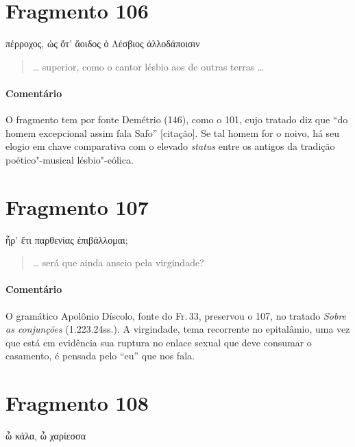 \pagebreak
\section{Fragmento 106}

\begin{gkverse}
πέρροχος, ὠς ὄτ’ ἄοιδος ὀ Λέσβιος ἀλλοδάποισιν
\end{gkverse}

\begin{verse}
\ldots{} superior, como o cantor lésbio aos de outras terras \ldots{}
\end{verse}

{\paragraph{Comentário} O fragmento tem por fonte Demétrio (146), como o 101, cujo tratado diz que
``do homem excepcional assim fala Safo” [citação]. Se tal homem for o
noivo, há seu elogio em chave comparativa com o elevado \textit{status}
entre os antigos da tradição poético"-musical lésbio"-eólica.}


\section{Fragmento 107}

\begin{gkverse}
ἦρ’ ἔτι παρθενίας ἐπιβάλλομαι;
\end{gkverse}

\begin{verse}
\ldots{} será que ainda anseio pela virgindade?
\end{verse}

{\paragraph{Comentário} O gramático Apolônio Díscolo, fonte do Fr.\,33, preservou o 107, no tratado
\textit{Sobre as conjunções} (1.223.24ss.). A virgindade, tema recorrente no epitalâmio, uma
vez que está em evidência sua ruptura no enlace sexual que deve consumar o
casamento, é pensada pelo “eu” que nos fala.}


\section{Fragmento 108}

\begin{gkverse}
ὦ κάλα, ὦ χαρίεσσα
\end{gkverse}

